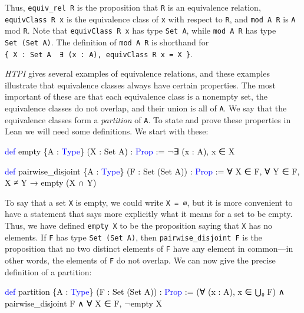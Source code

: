 \documentclass[
  letterpaper,
  DIV=11,
  numbers=noendperiod]{scrreprt}
\newenvironment{Shaded}{\begin{snugshade}}{\end{snugshade}}
\newcommand{\KeywordTok}[1]{\textcolor[rgb]{0.00,0.23,0.31}{#1}}
\newcommand{\NormalTok}[1]{\textcolor[rgb]{0.00,0.23,0.31}{#1}}
\renewcommand{\NormalTok}[1]{\textcolor[HTML]{000000}{#1}}
\renewcommand{\KeywordTok}[1]{\textcolor[HTML]{0000FF}{#1}}
\theoremstyle{remark}
\begin{document}
Thus, \texttt{equiv\_rel\ R} is the proposition that \texttt{R} is an
equivalence relation, \texttt{equivClass\ R\ x} is the equivalence class
of \texttt{x} with respect to \texttt{R}, and \texttt{mod\ A\ R} is
\texttt{A} mod \texttt{R}. Note that \texttt{equivClass\ R\ x} has type
\texttt{Set\ A}, while \texttt{mod\ A\ R} has type
\texttt{Set\ (Set\ A)}. The definition of \texttt{mod\ A\ R} is
shorthand for
\texttt{\{\ X\ :\ Set\ A\ \textbar{}\ ∃\ (x\ :\ A),\ equivClass\ R\ x\ =\ X\ \}}.

\emph{HTPI} gives several examples of equivalence relations, and these
examples illustrate that equivalence classes always have certain
properties. The most important of these are that each equivalence class
is a nonempty set, the equivalence classes do not overlap, and their
union is all of \texttt{A}. We say that the equivalence classes form a
\emph{partition} of \texttt{A}. To state and prove these properties in
Lean we will need some definitions. We start with these:

\begin{Shaded}
\begin{Highlighting}[]
\KeywordTok{def}\NormalTok{ empty \{A : }\KeywordTok{Type}\NormalTok{\} (X : Set A) : }\KeywordTok{Prop}\NormalTok{ := ¬∃ (x : A), x ∈ X }

\KeywordTok{def}\NormalTok{ pairwise\_disjoint \{A : }\KeywordTok{Type}\NormalTok{\} (F : Set (Set A)) : }\KeywordTok{Prop}\NormalTok{ :=}
\NormalTok{  ∀ X ∈ F, ∀ Y ∈ F, X ≠ Y → empty (X ∩ Y)}
\end{Highlighting}
\end{Shaded}

To say that a set \texttt{X} is empty, we could write \texttt{X\ =\ ∅},
but it is more convenient to have a statement that says more explicitly
what it means for a set to be empty. Thus, we have defined
\texttt{empty\ X} to be the proposition saying that \texttt{X} has no
elements. If \texttt{F} has type \texttt{Set\ (Set\ A)}, then
\texttt{pairwise\_disjoint\ F} is the proposition that no two distinct
elements of \texttt{F} have any element in common---in other words, the
elements of \texttt{F} do not overlap. We can now give the precise
definition of a partition:

\begin{Shaded}
\begin{Highlighting}[]
\KeywordTok{def}\NormalTok{ partition \{A : }\KeywordTok{Type}\NormalTok{\} (F : Set (Set A)) : }\KeywordTok{Prop}\NormalTok{ :=}
\NormalTok{  (∀ (x : A), x ∈ ⋃₀ F) ∧ pairwise\_disjoint F ∧ ∀ X ∈ F, ¬empty X}
\end{Highlighting}
\end{Shaded}
\end{document}
